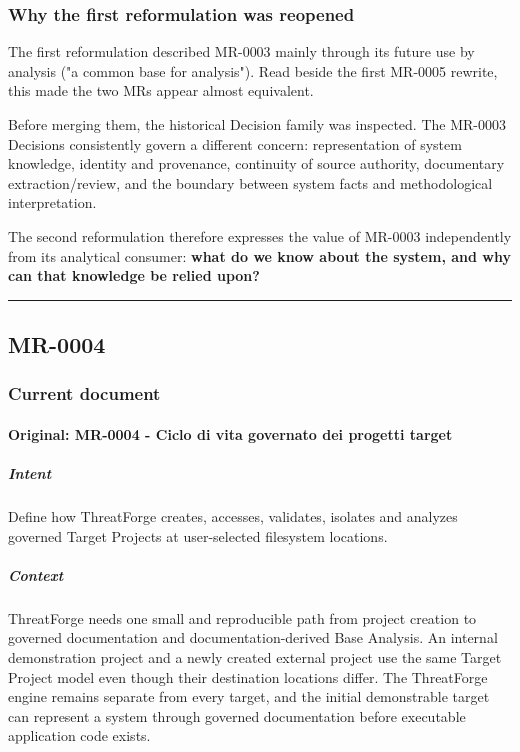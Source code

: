 \documentclass[
  10pt,
]{article}
\begin{document}
\subsubsection{Why the first reformulation was
reopened}\label{why-the-first-reformulation-was-reopened}

The first reformulation described MR-0003 mainly through its future use
by analysis ("a common base for analysis"). Read beside the first
MR-0005 rewrite, this made the two MRs appear almost equivalent.

Before merging them, the historical Decision family was inspected. The
MR-0003 Decisions consistently govern a different concern:
representation of system knowledge, identity and provenance, continuity
of source authority, documentary extraction/review, and the boundary
between system facts and methodological interpretation.

The second reformulation therefore expresses the value of MR-0003
independently from its analytical consumer: \textbf{what do we know
about the system, and why can that knowledge be relied upon?}

\begin{center}\rule{0.5\linewidth}{0.5pt}\end{center}

\subsection{MR-0004}\label{mr-0004}

\subsubsection{Current document}\label{current-document-3}

\paragraph{Original: MR-0004 - Ciclo di vita governato dei progetti
target}\label{original-mr-0004---ciclo-di-vita-governato-dei-progetti-target}

\subparagraph{Intent}\label{intent-7}

Define how ThreatForge creates, accesses, validates, isolates and
analyzes governed Target Projects at user-selected filesystem locations.

\subparagraph{Context}\label{context-7}

ThreatForge needs one small and reproducible path from project creation
to governed documentation and documentation-derived Base Analysis. An
internal demonstration project and a newly created external project use
the same Target Project model even though their destination locations
differ. The ThreatForge engine remains separate from every target, and
the initial demonstrable target can represent a system through governed
documentation before executable application code exists.
\end{document}
